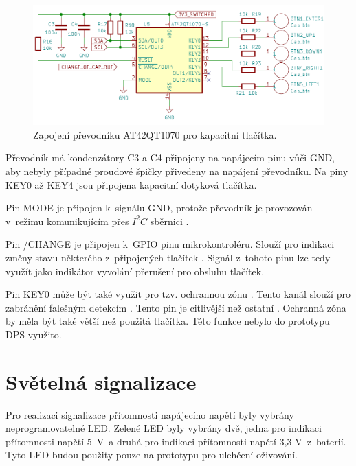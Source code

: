 \begin{figure}[!h]
  \begin{center}
    \includegraphics[scale=0.55]{obrazky/AT42QT1070.png}
  \end{center}
  \caption[Zapojení převodníku AT42QT1070 pro kapacitní tlačítka]{Zapojení převodníku AT42QT1070 pro kapacitní tlačítka.}
\end{figure}

Převodník má kondenzátory C3 a C4 připojeny na napájecím pinu vůči GND, aby nebyly případné proudové špičky přivedeny na napájení převodníku. Na piny KEY0 až 
KEY4 jsou připojena kapacitní dotyková tlačítka. 

Pin MODE je připojen k~signálu GND, protože převodník je provozován v~režimu komunikujícím přes $I^2C$ sběrnici \cite{conv_cap_but_AT42QT1070_dtsh}.

Pin /CHANGE je připojen k~GPIO pinu mikrokontroléru. Slouží pro indikaci změny stavu některého z~připojených tlačítek \cite{conv_cap_but_AT42QT1070_dtsh}. 
Signál z~tohoto pinu lze tedy využít jako indikátor vyvolání přerušení pro obsluhu tlačítek. 

Pin KEY0 může být také využit pro tzv. ochrannou zónu \cite{conv_cap_but_AT42QT1070_dtsh}. Tento kanál slouží pro zabránění falešným 
detekcím \cite{conv_cap_but_AT42QT1070_dtsh}. Tento pin je citlivější než ostatní \cite{conv_cap_but_AT42QT1070_dtsh}. Ochranná zóna by měla být také větší 
než použitá tlačítka. Této funkce nebylo do prototypu DPS využito. 

\section{Světelná signalizace}
Pro realizaci signalizace přítomnosti napájecího napětí byly vybrány neprogramovatelné LED. Zelené LED byly vybrány dvě, jedna pro 
indikaci přítomnosti napětí 5~V~a druhá pro indikaci přítomnosti napětí 3,3 V~z~baterií. Tyto LED budou použity pouze na prototypu 
pro ulehčení oživování. 

